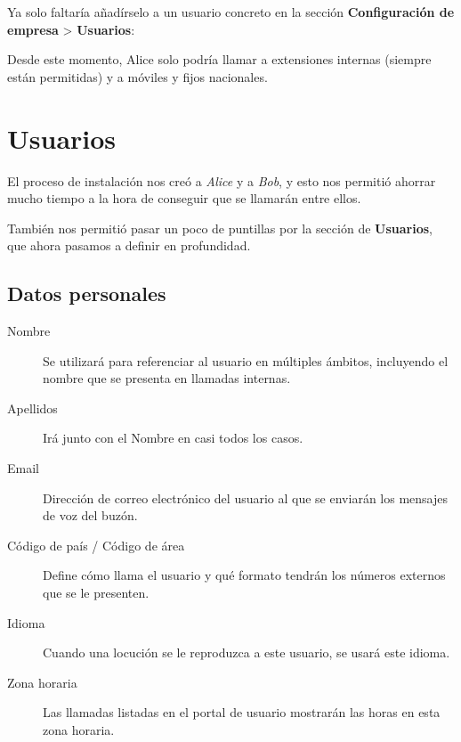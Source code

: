 \documentclass[letterpaper,10pt,spanish]{sphinxmanual}
\begin{document}
\noindent{}

Ya solo faltaría añadírselo a un usuario concreto en la sección \textbf{Configuración de empresa} \textgreater{} \textbf{Usuarios}:

\noindent{}

Desde este momento, Alice solo podría llamar a extensiones internas (siempre están permitidas) y a móviles y fijos nacionales.


\section{Usuarios}
\label{pbx_features/users::doc}\label{pbx_features/users:users}\label{pbx_features/users:users-configuration}
El proceso de instalación nos creó a \emph{Alice} y a \emph{Bob}, y esto nos permitió ahorrar mucho tiempo a la hora de conseguir que se llamarán entre ellos.

También nos permitió pasar un poco de puntillas por la sección de \textbf{Usuarios}, que ahora pasamos a definir en profundidad.


\subsection{Datos personales}
\label{pbx_features/users:personal-data}
\noindent{}
\begin{description}
\item[{Nombre}] \leavevmode{}\label{pbx_features/users:term-name}
Se utilizará para referenciar al usuario en múltiples ámbitos, incluyendo el nombre que se presenta en llamadas internas.

\item[{Apellidos}] \leavevmode{}\label{pbx_features/users:term-lastname}
Irá junto con el Nombre en casi todos los casos.

\item[{Email}] \leavevmode{}\label{pbx_features/users:term-email}
Dirección de correo electrónico del usuario al que se enviarán los mensajes de voz del buzón.

\item[{Código de país / Código de área}] \leavevmode{}\label{pbx_features/users:term-country-code-area-code}
Define cómo llama el usuario y qué formato tendrán los números externos que se le presenten.

\item[{Idioma}] \leavevmode{}\label{pbx_features/users:term-language}
Cuando una locución se le reproduzca a este usuario, se usará este idioma.

\item[{Zona horaria}] \leavevmode{}\label{pbx_features/users:term-timezone}
Las llamadas listadas en el portal de usuario mostrarán las horas en esta zona horaria.

\end{description}
\end{document}
